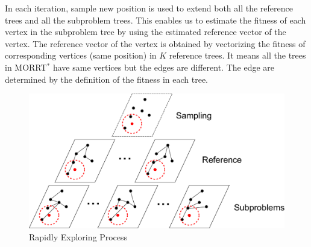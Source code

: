\documentclass[conference]{IEEEtran}
\begin{document}
In each iteration, sample new position is used to extend both all the reference trees and all the subproblem trees.
This enables us to estimate the fitness of each vertex in the subproblem tree by using the estimated reference vector of the vertex.
The reference vector of the vertex is obtained by vectorizing the fitness of corresponding vertices (same position) in $ K $ reference trees.
It means all the trees in MORRT$^{*}$ have same vertices but the edges are different.
The edge are determined by the definition of the fitness in each tree.


\begin{figure}[H]
\centering
\includegraphics[width=0.9\linewidth]{./fig/MORRTstar}
\caption{Rapidly Exploring Process}
\label{fig:MORRTstar}
\end{figure}
\end{document}
